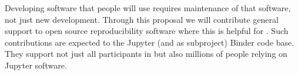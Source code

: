 \begin{task}[
  title=Maintenance of open source reproducibility software,
  id=maintenance,
  lead=SRL,
  PM=6,
  wphases={0-24!.25},
  partners={QS}
]

Developing software that people will use requires maintenance of that
software, not just new development. Through  this proposal we will
contribute general support to open source reproducibility software
where this is helpful for \TheProject. Such contributions are expected 
to the Jupyter (and as subproject) Binder code base. They support not
just all participants in \TheProject but also millions of people
relying on Jupyter software.


% 
% 
% 
% 

\end{task}
